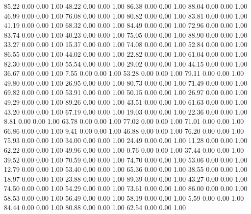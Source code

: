    85.22   0.00   0.00   1.00
   48.22   0.00   0.00   1.00
   86.38   0.00   0.00   1.00
   88.04   0.00   0.00   1.00
   46.99   0.00   0.00   1.00
   76.08   0.00   0.00   1.00
   80.82   0.00   0.00   1.00
   83.81   0.00   0.00   1.00
   41.19   0.00   0.00   1.00
   68.32   0.00   0.00   1.00
   84.49   0.00   0.00   1.00
   72.96   0.00   0.00   1.00
   83.74   0.00   0.00   1.00
   40.23   0.00   0.00   1.00
   75.05   0.00   0.00   1.00
   88.90   0.00   0.00   1.00
   33.27   0.00   0.00   1.00
   15.37   0.00   0.00   1.00
   74.08   0.00   0.00   1.00
   52.84   0.00   0.00   1.00
   86.55   0.00   0.00   1.00
   44.02   0.00   0.00   1.00
   22.82   0.00   0.00   1.00
   61.04   0.00   0.00   1.00
   82.30   0.00   0.00   1.00
   55.54   0.00   0.00   1.00
   29.02   0.00   0.00   1.00
   44.15   0.00   0.00   1.00
   36.67   0.00   0.00   1.00
    7.55   0.00   0.00   1.00
   53.28   0.00   0.00   1.00
   79.11   0.00   0.00   1.00
   49.80   0.00   0.00   1.00
   26.95   0.00   0.00   1.00
   80.73   0.00   0.00   1.00
   71.49   0.00   0.00   1.00
   69.82   0.00   0.00   1.00
   53.91   0.00   0.00   1.00
   50.15   0.00   0.00   1.00
   26.97   0.00   0.00   1.00
   49.29   0.00   0.00   1.00
   89.26   0.00   0.00   1.00
   43.51   0.00   0.00   1.00
   61.63   0.00   0.00   1.00
   43.20   0.00   0.00   1.00
   67.19   0.00   0.00   1.00
   19.03   0.00   0.00   1.00
   22.36   0.00   0.00   1.00
    8.81   0.00   0.00   1.00
   63.78   0.00   0.00   1.00
   77.02   0.00   0.00   1.00
   71.01   0.00   0.00   1.00
   66.86   0.00   0.00   1.00
    9.41   0.00   0.00   1.00
   46.88   0.00   0.00   1.00
   76.20   0.00   0.00   1.00
   75.93   0.00   0.00   1.00
   34.00   0.00   0.00   1.00
   24.49   0.00   0.00   1.00
   11.28   0.00   0.00   1.00
   62.22   0.00   0.00   1.00
   49.96   0.00   0.00   1.00
    0.76   0.00   0.00   1.00
   37.44   0.00   0.00   1.00
   39.52   0.00   0.00   1.00
   70.59   0.00   0.00   1.00
   74.70   0.00   0.00   1.00
   53.06   0.00   0.00   1.00
   12.79   0.00   0.00   1.00
   53.40   0.00   0.00   1.00
   65.36   0.00   0.00   1.00
   38.55   0.00   0.00   1.00
   18.97   0.00   0.00   1.00
   23.88   0.00   0.00   1.00
   89.39   0.00   0.00   1.00
   43.27   0.00   0.00   1.00
   74.50   0.00   0.00   1.00
   54.29   0.00   0.00   1.00
   73.61   0.00   0.00   1.00
   86.00   0.00   0.00   1.00
   58.53   0.00   0.00   1.00
   56.49   0.00   0.00   1.00
   58.19   0.00   0.00   1.00
    5.59   0.00   0.00   1.00
   84.44   0.00   0.00   1.00
   80.88   0.00   0.00   1.00
   62.54   0.00   0.00   1.00
